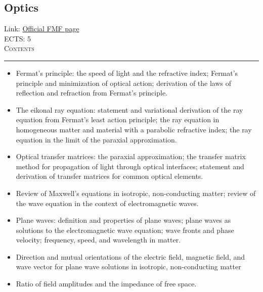 \documentclass[11pt, a4paper]{article}
\newenvironment{course}[3]{
\subsection{#1}%
Link: \href{#2}{Official FMF page}\\%
ECTS: #3%
\vspace{1ex}
\\
{\large \textsc{Contents}}\\[-0.9ex]%
\rule{\textwidth}{0.5pt}
\vspace{-3ex}
}
{}
\newenvironment{chapter}[1]{
\begin{tcolorbox}[title=#1, breakable]
}
{\end{tcolorbox}}
\begin{document}
\begin{course}{Optics}{https://www.fmf.uni-lj.si/en/study-physics/programmes/1fiz/2020/7000777/courses/1165/}{5}
    \label{optics}

    \begin{chapter}{Review of geometrical optics}
        \begin{itemize}
        
            \item Fermat's principle: the speed of light and the refractive index; Fermat's principle and minimization of optical action; derivation of the laws of reflection and refraction from Fermat's principle.

            \item The eikonal ray equation: statement and variational derivation of the ray equation from Fermat's least action principle; the ray equation in homogeneous matter and material with a parabolic refractive index; the ray equation in the limit of the paraxial approximation.

            \item Optical transfer matrices: the paraxial approximation; the transfer matrix method for propagation of light through optical interfaces; statement and derivation of transfer matrices for common optical elements.
        
        \end{itemize}
    \end{chapter}

    \begin{chapter}{Fundamentals of wave optics}
        \begin{itemize}
        
            \item Review of Maxwell's equations in isotropic, non-conducting matter; review of the wave equation in the context of electromagnetic waves.

            \item Plane waves: definition and properties of plane waves; plane waves as solutions to the electromagnetic wave equation; wave fronts and phase velocity; frequency, speed, and wavelength in matter.

            \item Direction and mutual orientations of the electric field, magnetic field, and wave vector for plane wave solutions in isotropic, non-conducting matter

            \item Ratio of field amplitudes and the impedance of free space.


\end{itemize}
\end{chapter}
\end{course}
\end{document}
